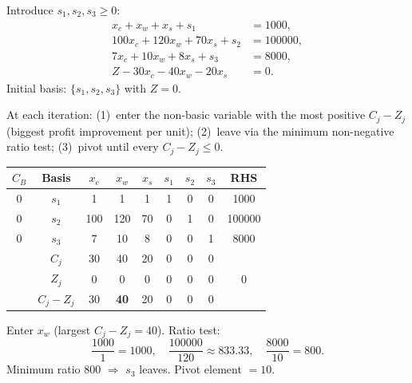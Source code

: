 Introduce \(s_1,s_2,s_3\ge 0\):
\begin{align*}
  x_c + x_w + x_s + s_1 &= 1000,\\
  100x_c + 120x_w + 70x_s + s_2 &= 100000,\\
  7x_c + 10x_w + 8x_s + s_3 &= 8000,\\
  Z - 30x_c - 40x_w - 20x_s &= 0.
\end{align*}
Initial basis: \(\{s_1,s_2,s_3\}\) with \(Z=0\).


\begin{ideabox}
At each iteration: (1)~enter the non-basic variable with the most positive
\(C_j-Z_j\) (biggest profit improvement per unit); (2)~leave via the minimum
non-negative ratio test; (3)~pivot until every \(C_j-Z_j\le 0\).
\end{ideabox}

\begin{center}
\renewcommand{\arraystretch}{1.2}
\begin{tabular}{c|c|ccc|ccc|c}
\toprule
\(C_B\) & Basis & \(x_c\) & \(x_w\) & \(x_s\) & \(s_1\) & \(s_2\) & \(s_3\) & RHS \\
\midrule
0 & \(s_1\) & 1 & 1 & 1 & 1 & 0 & 0 & 1000 \\
0 & \(s_2\) & 100 & 120 & 70 & 0 & 1 & 0 & 100000 \\
0 & \(s_3\) & 7 & 10 & 8 & 0 & 0 & 1 & 8000 \\
\midrule
 & \(C_j\) & 30 & 40 & 20 & 0 & 0 & 0 & \\
 & \(Z_j\) & 0 & 0 & 0 & 0 & 0 & 0 & 0 \\
 & \(C_j-Z_j\) & 30 & \textbf{40} & 20 & 0 & 0 & 0 & \\
\bottomrule
\end{tabular}
\end{center}

Enter \(x_w\) (largest \(C_j-Z_j=40\)). Ratio test:
\[
  \frac{1000}{1}=1000,\quad
  \frac{100000}{120}\approx 833.33,\quad
  \frac{8000}{10}=800.
\]
Minimum ratio \(800\) \(\Rightarrow\) \(s_3\) leaves. Pivot element \(=10\).

